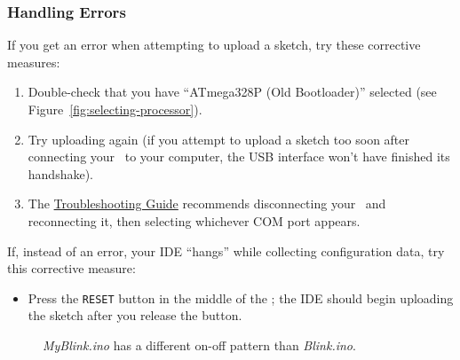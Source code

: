 \subsubsection*{Handling Errors}

If you get an error when attempting to upload a sketch, try these corrective measures:

\begin{enumerate}
    \item Double-check that you have ``ATmega328P (Old Bootloader)'' selected (see Figure~\ref{fig:selecting-processor}).
    \item Try uploading again (if you attempt to upload a sketch too soon after connecting your \developmentboard\ to your computer, the USB interface won't have finished its handshake).
    \item The \href{https://support.arduino.cc/hc/en-us/articles/4401874331410--Error-avrdude-when-uploading}{Troubleshooting Guide} recommends disconnecting your \developmentboard\ and reconnecting it, then selecting whichever COM port appears.
\end{enumerate}

If, instead of an error, your IDE ``hangs'' while collecting configuration data, try this corrective measure:

\begin{itemize}
\item Press the \texttt{RESET} button in the middle of the \developmentboard; the IDE should begin uploading the sketch after you release the button.
\end{itemize}

\begin{figure}
    \centering
    \caption{\textit{MyBlink.ino} has a different on-off pattern than \textit{Blink.ino}.\label{fig:myblink}}
\end{figure}

